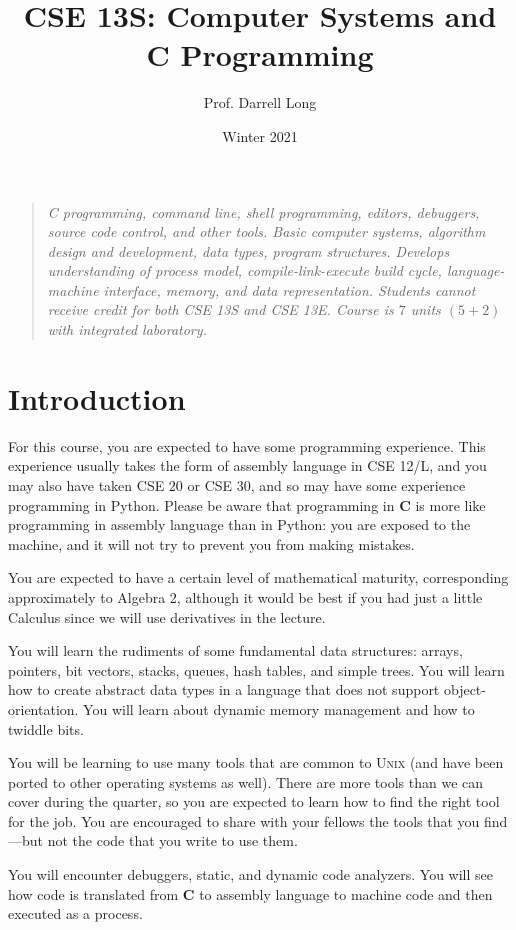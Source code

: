 \documentclass{article}
\title{CSE 13S: Computer Systems and \textbf{C} Programming}
\author{Prof.\xspace Darrell Long}
\date{Winter 2021}
\begin{document}
\maketitle
\begin{quotation}
\emph{
C programming, command line, shell programming, editors, debuggers,
source code control, and other tools. Basic computer systems,
algorithm design and development, data types, program structures.
Develops understanding of process model, compile-link-execute build
cycle, language-machine interface, memory, and data representation.
Students cannot receive credit for both CSE 13S and CSE 13E. Course
is $7$ units $(5 + 2)$ with integrated laboratory.
}
\end{quotation}

\section{Introduction}

For this course, you are expected to have some programming experience.
This experience usually takes the form of assembly language in CSE
12/L, and you may also have taken CSE 20 or CSE 30, and so may have
some experience programming in Python. Please be aware that programming
in \textbf{C} is more like programming in assembly language than
in Python: you are exposed to the machine, and it will not try to
prevent you from making mistakes.

You are expected to have a certain level of mathematical maturity,
corresponding approximately to Algebra 2, although it would be best
if you had just a little Calculus since we will use derivatives in
the lecture.

You will learn the rudiments of some fundamental data structures:
arrays, pointers, bit vectors, stacks, queues, hash tables, and
simple trees. You will learn how to create abstract data types in
a language that does not support object-orientation. You will learn
about dynamic memory management and how to twiddle bits.

You will be learning to use many tools that are common to \textsc{Unix}
(and have been ported to other operating systems as well). There
are more tools than we can cover during the quarter, so you are
expected to learn how to find the right tool for the job. You are
encouraged to share with your fellows the tools that you find---but
not the code that you write to use them.

You will encounter debuggers, static, and dynamic code analyzers.
You will see how code is translated from \textbf{C} to assembly
language to machine code and then executed as a process.
\end{document}
